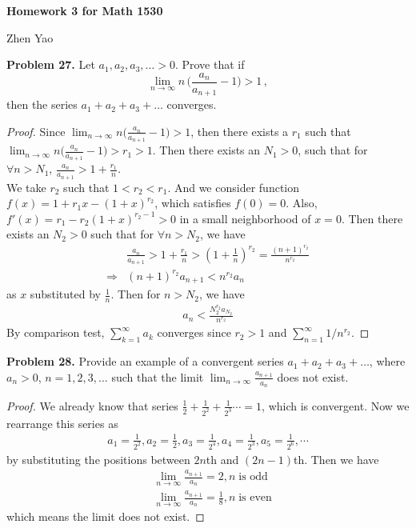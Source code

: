 \documentclass[12pt,leqno]{amsart}
\begin{document}
\centerline{\bf Homework 3 for Math 1530}
\centerline{Zhen Yao}


\bigskip


\noindent
{\bf Problem 27.}
Let $a_1, a_2, a_3,\ldots>0$. Prove that if
$$
\lim_{n\to\infty} n\, \Big( \frac{a_n}{a_{n+1}} - 1\Big) >1\, ,
$$
then the series $a_1+a_2+a_3+\ldots$ converges.

\begin{proof}
Since $\lim_{n\to\infty} n \Big( \frac{a_n}{a_{n+1}} - 1\Big) >1$, then there exists a $r_1$ such that $\lim_{n\to\infty} n \Big( \frac{a_n}{a_{n+1}} - 1\Big) >r_1>1$. Then there exists an $N_1>0$, such that for $\forall n>N_1$, $\frac{a_n}{a_{n+1}}>1+\frac{r_1}{n}$. \\
\hspace*{3em}We take $r_2$ such that $1<r_2<r_1$. And we consider function $f(x)=1+r_1x-(1+x)^{r_2}$, which satisfies $f(0)=0$. Also, $f'(x)=r_1-r_2(1+x)^{r_2-1}>0$ in a small neighborhood of $x=0$. Then there exists an $N_2>0$ such that for $\forall n>N_2$, we have
\begin{align*}
    & \frac{a_n}{a_{n+1}}> 1+\frac{r_1}{n} > \left(1+\frac{1}{n} \right)^{r_2} = \frac{(n+1)^{r_2}}{n^{r_2}} \\
    \Rightarrow & (n+1)^{r_2} a_{n+1} < n^{r_2}a_n
\end{align*}
as $x$ substituted by $\frac{1}{n}$. Then for $n>N_2$, we have 
\begin{align*}
    a_n < \frac{N_2^{r_2}a_{N_2}}{n^{r_2}}
\end{align*}
By comparison test, $\sum^\infty_{k=1} a_k$ converges since $r_2>1$ and $\sum^\infty_{n=1} 1/n^{r_2}$.
\end{proof}

\medskip

\noindent
{\bf Problem 28.}
Provide an example of a convergent series
$a_1+a_2+a_3+\ldots$, where $a_n>0$, $n=1,2,3,\ldots$ such that
the limit $\lim_{n\to\infty} \frac{a_{n+1}}{a_n}$ does not exist.

\begin{proof}
We already know that series $\frac{1}{2} + \frac{1}{2^2} + \frac{1}{2^3} \cdots = 1$, which is convergent. Now we rearrange this series as
\begin{align*}
    a_1 = \frac{1}{2^2}, a_2 = \frac{1}{2}, a_3 = \frac{1}{2^4}, a_4 = \frac{1}{2^3}, a_5 = \frac{1}{2^6}, \cdots
\end{align*}
by substituting the positions between $2n$th and $(2n-1)$th. Then we have 
\begin{align*}
    & \lim_{n\to\infty} \frac{a_{n+1}}{a_n} = 2, n\;\text{is odd} \\
    & \lim_{n\to\infty} \frac{a_{n+1}}{a_n} = \frac{1}{8}, n\;\text{is even}
\end{align*}
which means the limit does not exist.
\end{proof}
\end{document}
